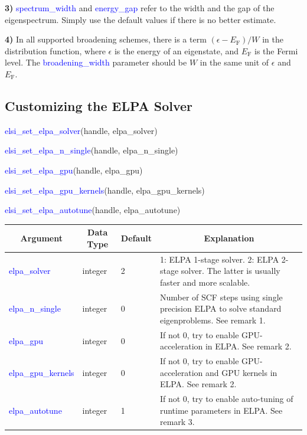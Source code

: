 \documentclass{report}
\begin{document}
\textbf{3)} \textcolor{blue}{spectrum\_width} and \textcolor{blue}{energy\_gap} refer to the width and the gap of the eigenspectrum. Simply use the default values if there is no better estimate.

\textbf{4)} In all supported broadening schemes, there is a term $(\epsilon - E_\text{F})/W$ in the distribution function, where $\epsilon$ is the energy of an eigenstate, and $E_\text{F}$ is the Fermi level. The \textcolor{blue}{broadening\_width} parameter should be $W$ in the same unit of $\epsilon$ and $E_\text{F}$.

\subsection{Customizing the ELPA Solver}
\label{subsec:setter_elpa}
\begin{labeling}{\hspace{6cm}}
\item [\hspace{0.3cm} \textcolor{blue}{elsi\_set\_elpa\_solver}(handle, elpa\_solver)]
\item [\hspace{0.3cm} \textcolor{blue}{elsi\_set\_elpa\_n\_single}(handle, elpa\_n\_single)]
\item [\hspace{0.3cm} \textcolor{blue}{elsi\_set\_elpa\_gpu}(handle, elpa\_gpu)]
\item [\hspace{0.3cm} \textcolor{blue}{elsi\_set\_elpa\_gpu\_kernels}(handle, elpa\_gpu\_kernels)]
\item [\hspace{0.3cm} \textcolor{blue}{elsi\_set\_elpa\_autotune}(handle, elpa\_autotune)]
\end{labeling}

\begin{tabular}[]{|p{30mm}|p{20mm}|p{15mm}|p{100mm}|}
\hline
\multicolumn{1}{|c|}{\textbf{Argument}} & \multicolumn{1}{c|}{\textbf{Data Type}} & \multicolumn{1}{c|}{\textbf{Default}} & \multicolumn{1}{c|}{\textbf{Explanation}}\\
\hline
\textcolor{blue}{elpa\_solver}       & integer & 2 & 1: ELPA 1-stage solver. 2: ELPA 2-stage solver. The latter is usually faster and more scalable.\\
\hline
\textcolor{blue}{elpa\_n\_single}    & integer & 0 & Number of SCF steps using single precision ELPA to solve standard eigenproblems. See remark 1.\\
\hline
\textcolor{blue}{elpa\_gpu}          & integer & 0 & If not 0, try to enable GPU-acceleration in ELPA. See remark 2.\\
\hline
\textcolor{blue}{elpa\_gpu\_kernels} & integer & 0 & If not 0, try to enable GPU-acceleration and GPU kernels in ELPA. See remark 2.\\
\hline
\textcolor{blue}{elpa\_autotune}     & integer & 1 & If not 0, try to enable auto-tuning of runtime parameters in ELPA. See remark 3.\\
\hline
\end{tabular}
\end{document}
